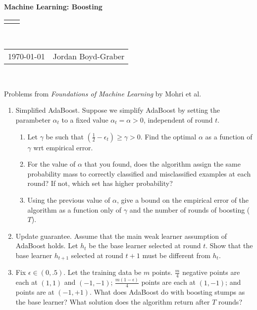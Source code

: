 \documentclass[12pt]{article}
\renewcommand{\title}[1]{\textbf{#1}\\}
\renewcommand{\line}{\begin{tabularx}{\textwidth}{X>{\raggedleft}X}\hline\\\end{tabularx}\\[-0.5cm]}
\newcommand{\leftright}[2]{\begin{tabularx}{\textwidth}{X>{\raggedleft}X}#1%
& #2\\\end{tabularx}\\[-0.5cm]}
\begin{document}
\title{Machine Learning: Boosting}
\line
\leftright{\today}{Jordan Boyd-Graber} %

\begin{center}
  Problems from \emph{Foundations of Machine Learning} by Mohri et al.
\end{center}

\begin{enumerate}
  \item Simplified AdaBoost.  Suppose we simplify AdaBoost by setting
    the parambeter $\alpha_t$ to a fixed value $\alpha_t = \alpha> 0$,
    independent of round $t$.
    \begin{enumerate}
      \item Let $\gamma$ be such that $\left(\frac{1}{2} - \epsilon_t \right)
        \geq \gamma > 0$.  Find the optimal $\alpha$ as a function of $\gamma$
        wrt empirical error.

     \item For the value of $\alpha$ that you found, does the algorithm assign
       the same probability mass to correctly classified and misclassified
       examples at each round?  If not, which set has higher probability?

     \item Using the previous value of $\alpha$, give a bound on the empirical
       error of the algorithm as a function only of $\gamma$ and the number of
       rounds of boosting ($T$).
    \end{enumerate}

    \item Update guarantee.  Assume that the main weak learner assumption of
      AdaBoost holds.  Let $h_t$ be the base learner selected at round $t$.  Show
      that the base learner $h_{t+1}$ selected at round $t+1$ must be different
      from $h_t$.

    \item Fix $\epsilon \in (0, .5)$.  Let the training data be $m$
      points.  $\frac{m}{4}$ negative points are each at $(1,1)$ and
      $(-1, -1)$; $\frac{m (1 - \epsilon)}{4}$ points are each at $(1,
      -1)$; and  points are at $(-1, +1)$.
      What does AdaBoost do with boosting stumps as the base learner?
      What solution does the algorithm return after $T$ rounds?

\end{enumerate}
\end{document}
